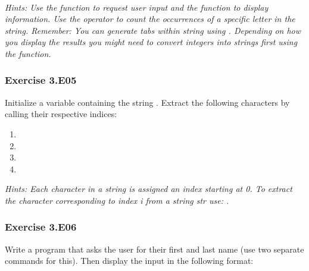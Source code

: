 {}\\
\\
\\
\\
\\
\\


\textit{Hints:
Use the {} function to request user input and the {} function to display information. Use the {} operator to count the occurrences of a specific letter in the string. Remember: You can generate tabs within string using {}. Depending on how you display the results you might need to convert integers into strings first using the {} function.}\\[1cm]




\subsubsection*{Exercise 3.E05}
Initialize a variable containing the string {}. Extract the following characters by calling their respective indices:
\begin{enumerate}[label=(\alph*)]
	\item {}
	\item {}
	\item {}
	\item {}
\end{enumerate}


\textit{Hints:
Each character in a string is assigned an index starting at 0. To extract the character
corresponding to index i from a string str use: {}.}\\[1cm]




\subsubsection*{Exercise 3.E06}
Write a program that asks the user for their first and last name (use two separate commands
for this). Then display the input in the following format:


